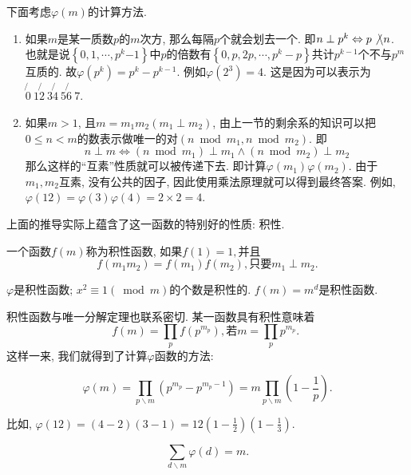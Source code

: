 \documentclass{ctexart}
\newcommand{\bzc}{\not\backslash}
\newcommand{\zc}{\backslash}
\begin{document}
下面考虑$\varphi (m)$的计算方法. 

\begin{enumerate}
    \item 如果$m$是某一质数$p$的$m$次方, 那么每隔$p$个就会划去一个. 即$n \perp p^k \Leftrightarrow p \bzc n$. 也就是说$\left\{0,1, \cdots, p^k {-1}\right\}$中$p$的倍数有$\left\{0, p, 2 p, \cdots, p^k-p\right\}$共计$p^{k-1}$个不与$p^m$互质的. 故$\varphi\left(p^k\right)=p^k-p^{k-1}$. 例如$\varphi\left(2^3\right)=4$. 这是因为可以表示为$\not{0}~1\not{2}~3\not{4}~5\not{6}~7$.
    \item 如果$m>1$, 且$m=m_1 m_2\left(m_1 \perp m_2\right)$, 由上一节的剩余系的知识可以把$0\leq n<m$的数表示做唯一的对$\left(n \bmod m_1, n \bmod m_2\right)$. 即$$
n \perp m \Leftrightarrow\left(n \bmod m_1\right) \perp m_1 \wedge\left(n \bmod m_2\right) \perp m_2
$$
那么这样的``互素''性质就可以被传递下去. 即计算$\varphi\left(m_1\right) \varphi\left(m_2\right)$. 由于$m_1, m_2$互素, 没有公共的因子, 因此使用乘法原理就可以得到最终答案.  例如, $\varphi(12)=\varphi(3)\varphi(4)=2 \times  2=4$. 
\end{enumerate}

上面的推导实际上蕴含了这一函数的特别好的性质: 积性. 

\begin{definition}[积性函数]

    一个函数$f(m)$称为积性函数, 如果$f(1)=1, $并且
    \[
        f(m_1m_2)=f(m_1)f(m_2), \text{只要}m_1\perp m_2.
    \]
\end{definition}

\begin{example} $\varphi$是积性函数; $x^2 \equiv 1 (\bmod m)$的个数是积性的. $f(m)=m^d$是积性函数. 
    
\end{example}

积性函数与唯一分解定理也联系密切. 某一函数具有积性意味着
$$
f(m)=\prod_p f\left(p^{m_p}\right), \text{若} m=\prod_p p^{m_p} \text {. }
$$
这样一来, 我们就得到了计算$\varphi$函数的方法:

$$
\varphi(m)=\prod_{p \backslash m}\left(p^{m_p}-p^{m_p-1}\right)=m \prod_{p \backslash m}\left(1-\frac{1}{p}\right) .
$$

比如, $\varphi(12)=(4-2)(3-1)=12\left(1-\frac{1}{2}\right)\left(1-\frac{1}{3}\right)$.

\begin{prop}
    $$
\sum_{d \zc m} \varphi(d)=m .
$$
    
\end{prop}
\end{document}
